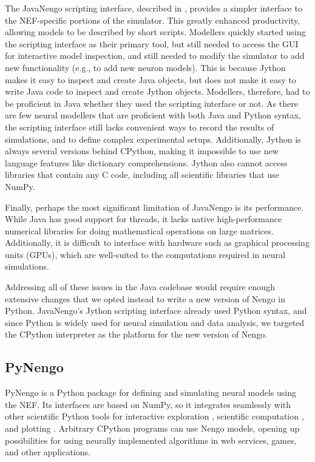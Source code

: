 \documentclass{frontiersSCNS}
\begin{document}
The JavaNengo scripting interface,
described in \citet{stewart2009},
provides a simpler interface
to the NEF-specific portions of the simulator.
This greatly enhanced productivity,
allowing models to be described
by short scripts.
Modellers quickly started using
the scripting interface
as their primary tool,
but still needed to access the GUI
for interactive model inspection,
and still needed to modify the simulator
to add new functionality
(e.g., to add new neuron models).
This is because Jython makes it easy
to inspect and create Java objects,
but does not make it easy to
write Java code to
inspect and create Jython objects.
Modellers, therefore, had to be
proficient in Java whether
they used the scripting interface or not.
As there are few neural modellers
that are proficient with both Java and Python syntax,
the scripting interface still lacks
convenient ways to record the results of simulations,
and to define complex experimental setups.
Additionally, Jython is always several versions
behind CPython, making it impossible
to use new language features
like dictionary comprehensions.
Jython also cannot access libraries
that contain any C code,
including all scientific libraries
that use NumPy.

Finally, perhaps the most significant limitation
of JavaNengo is its performance.
While Java has good support for threads,
it lacks native high-performance numerical libraries
for doing mathematical operations on large matrices.
Additionally, it is difficult to interface with
hardware such as graphical processing units (GPUs),
which are well-suited to the computations
required in neural simulations.

Addressing all of these issues
in the Java codebase would require
enough extensive changes
that we opted instead
to write a new version of Nengo in Python.
JavaNengo's Jython scripting interface
already used Python syntax,
and since Python is widely used
for neural simulation and data analysis,
we targeted the CPython interpreter
as the platform for the new version of Nengo.

\subsection{PyNengo}

PyNengo is a Python package for
defining and simulating
neural models using the NEF.
Its interfaces are based on NumPy,
so it integrates seamlessly
with other scientific Python tools
for interactive exploration \citep{perez2007},
scientific computation \citep{oliphant2007},
and plotting \citep{hunter2007}.
Arbitrary CPython programs
can use Nengo models,
opening up possibilities
for using neurally implemented algorithms
in web services, games, and other applications.
\end{document}
